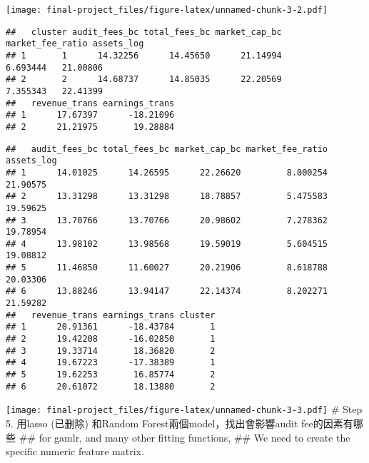 \documentclass[
]{article}
\begin{document}
\texttt{[image: final-project\_files/figure-latex/unnamed-chunk-3-2.pdf]}

\begin{verbatim}
##   cluster audit_fees_bc total_fees_bc market_cap_bc market_fee_ratio assets_log
## 1       1      14.32256      14.45650      21.14994         6.693444   21.00806
## 2       2      14.68737      14.85035      22.20569         7.355343   22.41399
##   revenue_trans earnings_trans
## 1      17.67397      -18.21096
## 2      21.21975       19.28884
\end{verbatim}

\begin{verbatim}
##   audit_fees_bc total_fees_bc market_cap_bc market_fee_ratio assets_log
## 1      14.01025      14.26595      22.26620         8.000254   21.90575
## 2      13.31298      13.31298      18.78857         5.475583   19.59625
## 3      13.70766      13.70766      20.98602         7.278362   19.78954
## 4      13.98102      13.98568      19.59019         5.604515   19.08812
## 5      11.46850      11.60027      20.21906         8.618788   20.03306
## 6      13.88246      13.94147      22.14374         8.202271   21.59282
##   revenue_trans earnings_trans cluster
## 1      20.91361      -18.43784       1
## 2      19.42208      -16.02850       1
## 3      19.33714       18.36820       2
## 4      19.67223      -17.38389       1
## 5      19.62253       16.85774       2
## 6      20.61072       18.13880       2
\end{verbatim}

\texttt{[image: final-project\_files/figure-latex/unnamed-chunk-3-3.pdf]}
\# Step 5. 用lasso (已删除) 和Random Forest兩個model，找出會影響audit
fee的因素有哪些 \#\# for gamlr, and many other fitting functions, \#\#
We need to create the specific numeric feature matrix.
\end{document}
